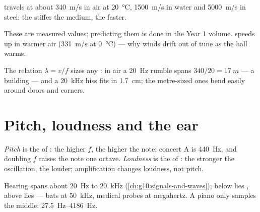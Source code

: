 \begin{proposition}\label{prop:g12:sound-acoustics:speed}
%
 travels at about \qty{340}{m/s} in air at
\qty{20}{\degreeCelsius}, \qty{1500}{m/s} in water and
\qty{5000}{m/s} in steel: the stiffer the medium, the
faster. \admitted
\end{proposition}

\begin{remark}\label{rem:g12:sound-acoustics:temperature}
These are measured values; predicting them is done in the Year 1
volume.  speeds up in warmer air (\qty{331}{m/s} at
\qty{0}{\degreeCelsius}) --- why winds drift out of tune as the hall warms.
\end{remark}

\begin{example}\label{ex:g12:sound-acoustics:wavelengths}
The relation $\lambda = v/f$ sizes any : in air a \qty{20}{Hz}
rumble spans $340/20 = \qty{17}{m}$ --- a building --- and a
\qty{20}{kHz} hiss fits in \qty{1.7}{cm}; the metre-sized ones bend
easily around doors and corners.
\end{example}

\section{Pitch, loudness and the ear}

\begin{definition}\label{def:g12:sound-acoustics:pitch-loudness}
\emph{Pitch} is the  of : the higher
$f$, the higher the note; concert A is \qty{440}{Hz}, and doubling
$f$ raises the note one octave. \emph{Loudness} is
the  of : the stronger the  oscillation,
the louder; amplification changes loudness, not pitch.
\end{definition}

\begin{remark}\label{rem:g12:sound-acoustics:audible}
Hearing spans about \qty{20}{Hz} to \qty{20}{kHz}
(\cref{ch:g10:signals-and-waves}); below lies , above lies
 --- bats at \qty{50}{kHz}, medical probes at megahertz. A
piano only samples the middle: \qtyrange{27.5}{4186}{Hz}.
\end{remark}

